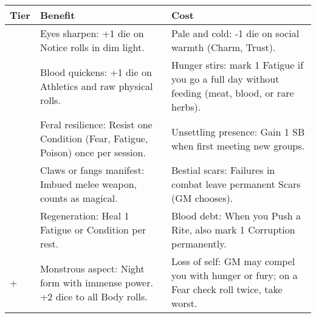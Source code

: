 \begin{longtable}{>{\raggedright\arraybackslash}p{1cm} p{5cm} p{5cm}}
\toprule
\textbf{Tier} & \textbf{Benefit} & \textbf{Cost} \\
\midrule
1 & Eyes sharpen: +1 die on Notice rolls in dim light. & Pale and cold: -1 die on social warmth (Charm, Trust). \\
\midrule
2 & Blood quickens: +1 die on Athletics and raw physical rolls. & Hunger stirs: mark 1 Fatigue if you go a full day without feeding (meat, blood, or rare herbs). \\
\midrule
3 & Feral resilience: Resist one Condition (Fear, Fatigue, Poison) once per session. & Unsettling presence: Gain 1 SB when first meeting new groups. \\
\midrule
4 & Claws or fangs manifest: Imbued melee weapon, counts as magical. & Bestial scars: Failures in combat leave permanent Scars (GM chooses). \\
\midrule
5 & Regeneration: Heal 1 Fatigue or Condition per rest. & Blood debt: When you Push a Rite, also mark 1 Corruption permanently. \\
\midrule
6+ & Monstrous aspect: Night form with immense power. +2 dice to all Body rolls. & Loss of self: GM may compel you with hunger or fury; on a Fear check roll twice, take worst. \\
\bottomrule
\end{longtable}